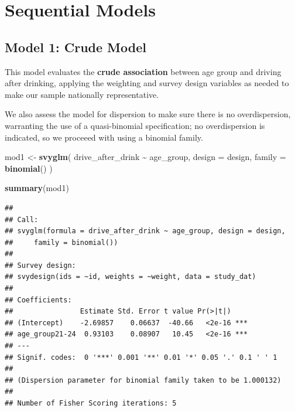 \documentclass[
]{article}
\newenvironment{Shaded}{\begin{snugshade}}{\end{snugshade}}
\newcommand{\AttributeTok}[1]{\textcolor[rgb]{0.13,0.29,0.53}{#1}}
\newcommand{\FunctionTok}[1]{\textcolor[rgb]{0.13,0.29,0.53}{\textbf{#1}}}
\newcommand{\NormalTok}[1]{#1}
\newcommand{\OtherTok}[1]{\textcolor[rgb]{0.56,0.35,0.01}{#1}}
\newcommand{\SpecialCharTok}[1]{\textcolor[rgb]{0.81,0.36,0.00}{\textbf{#1}}}
\begin{document}
\section{Sequential Models}\label{sequential-models}

\subsection{Model 1: Crude Model}\label{model-1-crude-model}

This model evaluates the \textbf{crude association} between age group
and driving after drinking, applying the weighting and survey design
variables as needed to make our sample nationally representative.

We also assess the model for dispersion to make sure there is no
overdispersion, warranting the use of a quasi-binomial specification; no
overdispersion is indicated, so we proceeed with using a binomial
family.

\begin{Shaded}
\begin{Highlighting}[]
\NormalTok{mod1 }\OtherTok{\textless{}{-}} \FunctionTok{svyglm}\NormalTok{(}
\NormalTok{  drive\_after\_drink }\SpecialCharTok{\textasciitilde{}}\NormalTok{ age\_group,}
  \AttributeTok{design =}\NormalTok{ design,}
  \AttributeTok{family =} \FunctionTok{binomial}\NormalTok{()}
\NormalTok{) }

\FunctionTok{summary}\NormalTok{(mod1) }
\end{Highlighting}
\end{Shaded}

\begin{verbatim}
## 
## Call:
## svyglm(formula = drive_after_drink ~ age_group, design = design, 
##     family = binomial())
## 
## Survey design:
## svydesign(ids = ~id, weights = ~weight, data = study_dat)
## 
## Coefficients:
##                Estimate Std. Error t value Pr(>|t|)    
## (Intercept)    -2.69857    0.06637  -40.66   <2e-16 ***
## age_group21-24  0.93103    0.08907   10.45   <2e-16 ***
## ---
## Signif. codes:  0 '***' 0.001 '**' 0.01 '*' 0.05 '.' 0.1 ' ' 1
## 
## (Dispersion parameter for binomial family taken to be 1.000132)
## 
## Number of Fisher Scoring iterations: 5
\end{verbatim}

\begin{Shaded}
\end{Shaded}
\end{document}

